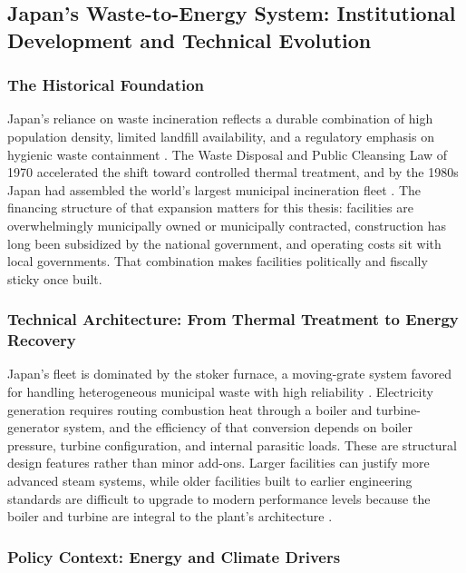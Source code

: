 \documentclass[12pt,a4paper]{article}
\begin{document}
\subsection{Japan's Waste-to-Energy System: Institutional Development and Technical Evolution}

\subsubsection{The Historical Foundation}

Japan's reliance on waste incineration reflects a durable combination of high population density, limited landfill availability, and a regulatory emphasis on hygienic waste containment \citep{Tanikawa2015}. The Waste Disposal and Public Cleansing Law of 1970 accelerated the shift toward controlled thermal treatment, and by the 1980s Japan had assembled the world's largest municipal incineration fleet \citep{TabataTsai2016}. The financing structure of that expansion matters for this thesis: facilities are overwhelmingly municipally owned or municipally contracted, construction has long been subsidized by the national government, and operating costs sit with local governments. That combination makes facilities politically and fiscally sticky once built.

\subsubsection{Technical Architecture: From Thermal Treatment to Energy Recovery}

Japan's fleet is dominated by the stoker furnace, a moving-grate system favored for handling heterogeneous municipal waste with high reliability \citep{Niessen2010}. Electricity generation requires routing combustion heat through a boiler and turbine-generator system, and the efficiency of that conversion depends on boiler pressure, turbine configuration, and internal parasitic loads. These are structural design features rather than minor add-ons. Larger facilities can justify more advanced steam systems, while older facilities built to earlier engineering standards are difficult to upgrade to modern performance levels because the boiler and turbine are integral to the plant's architecture \citep{Niessen2010, Sun2018}.

\subsubsection{Policy Context: Energy and Climate Drivers}
\end{document}
